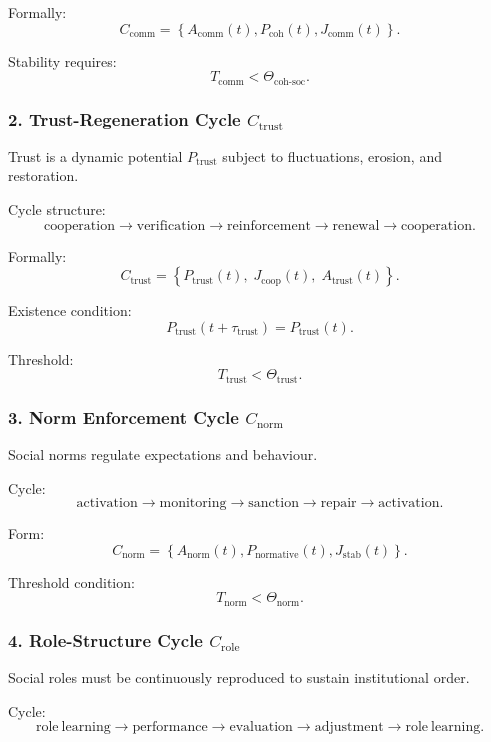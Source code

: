 Formally:
\[
  C_{\mathrm{comm}}
    =
    \left\{
      A_{\mathrm{comm}}(t),
      P_{\mathrm{coh}}(t),
      J_{\mathrm{comm}}(t)
    \right\}.
\]

Stability requires:
\[
  T_{\mathrm{comm}} < \Theta_{\mathrm{coh\text{-}soc}}.
\]

\subsubsection{2. Trust-Regeneration Cycle $C_{\mathrm{trust}}$}

Trust is a dynamic potential $P_{\mathrm{trust}}$ subject to fluctuations,
erosion, and restoration.

Cycle structure:
\[
  \mathrm{cooperation}
  \to
  \mathrm{verification}
  \to
  \mathrm{reinforcement}
  \to
  \mathrm{renewal}
  \to
  \mathrm{cooperation}.
\]

Formally:
\[
 C_{\mathrm{trust}}
   =
   \left\{
     P_{\mathrm{trust}}(t),\;
     J_{\mathrm{coop}}(t),\;
     A_{\mathrm{trust}}(t)
   \right\}.
\]

Existence condition:
\[
  P_{\mathrm{trust}}(t+\tau_{\mathrm{trust}})=
  P_{\mathrm{trust}}(t).
\]

Threshold:
\[
  T_{\mathrm{trust}} < \Theta_{\mathrm{trust}}.
\]

\subsubsection{3. Norm Enforcement Cycle $C_{\mathrm{norm}}$}

Social norms regulate expectations and behaviour.

Cycle:
\[
  \mathrm{activation}
  \to
  \mathrm{monitoring}
  \to
  \mathrm{sanction}
  \to
  \mathrm{repair}
  \to
  \mathrm{activation}.
\]

Form:
\[
  C_{\mathrm{norm}}=
  \left\{
    A_{\mathrm{norm}}(t),
    P_{\mathrm{normative}}(t),
    J_{\mathrm{stab}}(t)
  \right\}.
\]

Threshold condition:
\[
  T_{\mathrm{norm}} < \Theta_{\mathrm{norm}}.
\]

\subsubsection{4. Role-Structure Cycle $C_{\mathrm{role}}$}

Social roles must be continuously reproduced to sustain institutional order.

Cycle:
\[
  \mathrm{role\ learning}
  \to
  \mathrm{performance}
  \to
  \mathrm{evaluation}
  \to
  \mathrm{adjustment}
  \to
  \mathrm{role\ learning}.
\]

